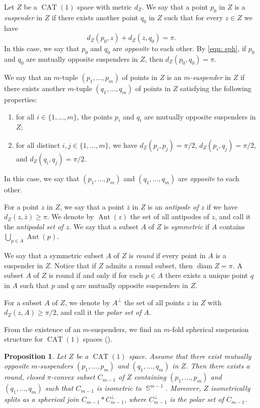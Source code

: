 \documentclass[a4paper,12pt]{amsart}
\newcommand{\Ant}{\operatorname{Ant}}
\newcommand{\CAT}{\operatorname{CAT}}
\newcommand{\diam}{\operatorname{diam}}
\newcommand{\Sph}{\operatorname{\mathbb{S}}}
\numberwithin{equation}{section}
\theoremstyle{plain}
\newtheorem{prop}[thm]{Proposition}
\theoremstyle{definition}
\theoremstyle{remark}
\begin{document}
Let $Z$ be a $\CAT(1)$ space with metric $d_Z$.
We say that 
a point $p_0$ in $Z$ is a \emph{suspender} in $Z$
if there exists another point $q_0$ in $Z$
such that for every $z \in Z$ we have
\begin{equation}
d_Z(p_0,z) + d_Z(z,q_0) = \pi.
\label{eqn: sph}
\end{equation}
In this case,
we say that $p_0$ and $q_0$ are \emph{opposite} to each other.
By \eqref{eqn: sph},
if $p_0$ and $q_0$ are mutually opposite suspenders in $Z$,
then $d_Z(p_0,q_0) = \pi$.

We say that an $m$-tuple $(p_1,\dots,p_m)$ of points in $Z$ is
an \emph{$m$-suspender} in $Z$
if there exists another $m$-tuple $(q_1,\dots,q_m)$ of points in $Z$
satisfying the following properties:
\begin{enumerate}
\item
for all $i \in \{ 1, \dots, m \}$,
the points $p_i$ and $q_i$ 
are mutually opposite suspenders in $Z$;
\item
for all distinct $i, j \in \{1, \dots, m\}$,
we have
$d_Z(p_i,p_j) = \pi/2$, 
$d_Z(p_i,q_j) = \pi/2$, 
and $d_Z(q_i,q_j) = \pi/2$.
\end{enumerate}
In this case, we say that $(p_1,\dots,p_m)$ and 
$(q_1,\dots,q_m)$ are \emph{opposite} to each other.

For a point $z$ in $Z$,
we say that
a point $\bar{z}$ in $Z$ is an \emph{antipode of $z$}
if we have $d_Z(z,\bar{z}) \ge \pi$.
We denote by $\Ant(z)$
the set of all antipodes of $z$,
and call it the \emph{antipodal set of $z$}.
We say that
a subset $A$ of $Z$ is
\emph{symmetric}
if $A$ contains $\bigcup_{p \in A} \Ant(p)$.

We say that a symmetric subset $A$ of $Z$ is 
\emph{round}
if every point in $A$ is a suspender in $Z$.
Notice that if $Z$ admits a round subset,
then $\diam Z = \pi$.
A subset $A$ of $Z$ is round
if and only if
for each $p \in A$
there exists a unique point $q$ in $A$ such that
$p$ and $q$ are mutually opposite suspenders in $Z$.

For a subset $A$ of $Z$,
we denote by $A^{\perp}$
the set of all points $z$ in $Z$ with $d_Z(z,A) \ge \pi/2$,
and call it the \emph{polar set of $A$}.

From the existence of an $m$-suspenders,
we find an $m$-fold spherical suspension structure
for $\CAT(1)$ spaces
(\cite[Proposition 3.7]{nagano6}).

\begin{prop}\label{prop: m0susp}
Let $Z$ be a $\CAT(1)$ space.
Assume that there exist mutually opposite $m$-suspenders
$(p_1,\dots,p_m)$ and $(q_1,\dots,q_m)$ in $Z$.
Then there exists 
a round, closed $\pi$-convex subset $C_{m-1}$ of $Z$
containing $(p_1,\dots,p_m)$ and $(q_1,\dots,q_m)$
such that $C_{m-1}$ is isometric to $\Sph^{m-1}$.
Moreover,
$Z$ isometrically splits as a spherical join
$C_{m-1} \ast C_{m-1}^{\perp}$,
where $C_{m-1}^{\perp}$ is the polar set of $C_{m-1}$.
\end{prop}
\end{document}
